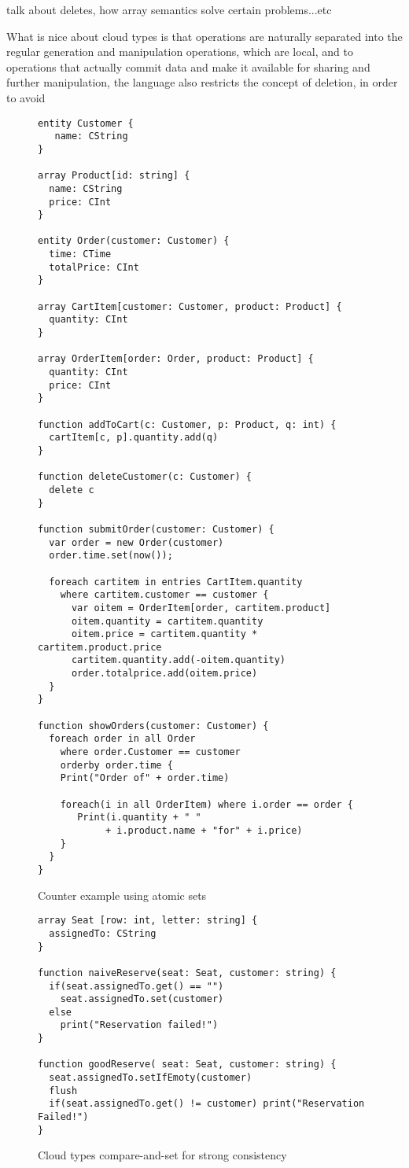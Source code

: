 talk about deletes, how array semantics solve certain problems...etc

What is nice about cloud types is that operations are naturally separated into
the regular generation and manipulation operations, which are local, and to
operations that actually commit data and make it available for sharing and
further manipulation, the language also restricts the concept of deletion, in
order to avoid 


\begin{figure}[tp]
\begin{lstlisting}
entity Customer {
   name: CString
}

array Product[id: string] {
  name: CString
  price: CInt
}

entity Order(customer: Customer) {
  time: CTime
  totalPrice: CInt
}

array CartItem[customer: Customer, product: Product] {
  quantity: CInt
}

array OrderItem[order: Order, product: Product] {
  quantity: CInt
  price: CInt
}

function addToCart(c: Customer, p: Product, q: int) {
  cartItem[c, p].quantity.add(q)
}

function deleteCustomer(c: Customer) {
  delete c
}

function submitOrder(customer: Customer) {
  var order = new Order(customer)
  order.time.set(now());

  foreach cartitem in entries CartItem.quantity 
    where cartitem.customer == customer {
      var oitem = OrderItem[order, cartitem.product]
      oitem.quantity = cartitem.quantity
      oitem.price = cartitem.quantity * cartitem.product.price
      cartitem.quantity.add(-oitem.quantity)
      order.totalprice.add(oitem.price)
  }
}

function showOrders(customer: Customer) {
  foreach order in all Order
    where order.Customer == customer
    orderby order.time {    
    Print("Order of" + order.time)
    
    foreach(i in all OrderItem) where i.order == order {
       Print(i.quantity + " " 
            + i.product.name + "for" + i.price)
    }
  }
}
\end{lstlisting}
\caption{Counter example using atomic sets}
\label{lst:ctStore}
\end{figure}


\begin{figure}[tp]
\begin{lstlisting}
array Seat [row: int, letter: string] {
  assignedTo: CString
}

function naiveReserve(seat: Seat, customer: string) {
  if(seat.assignedTo.get() == "")
    seat.assignedTo.set(customer)
  else 
    print("Reservation failed!")
}

function goodReserve( seat: Seat, customer: string) {
  seat.assignedTo.setIfEmoty(customer)
  flush
  if(seat.assignedTo.get() != customer) print("Reservation Failed!")
}
\end{lstlisting}
\caption{Cloud types compare-and-set for strong consistency}
\label{lst:acCmpSet}
\end{figure}

